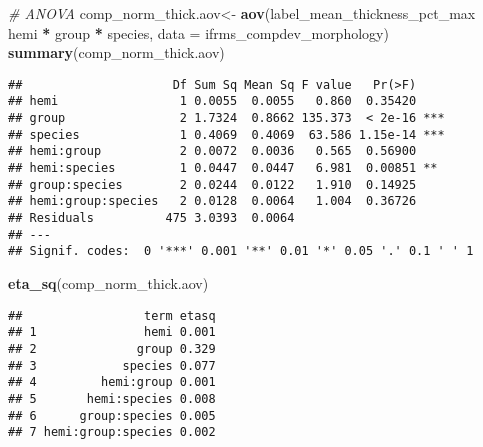 \documentclass[
]{article}
\newenvironment{Shaded}{\begin{snugshade}}{\end{snugshade}}
\newcommand{\CommentTok}[1]{\textcolor[rgb]{0.56,0.35,0.01}{\textit{#1}}}
\newcommand{\DataTypeTok}[1]{\textcolor[rgb]{0.13,0.29,0.53}{#1}}
\newcommand{\KeywordTok}[1]{\textcolor[rgb]{0.13,0.29,0.53}{\textbf{#1}}}
\newcommand{\NormalTok}[1]{#1}
\newcommand{\OperatorTok}[1]{\textcolor[rgb]{0.81,0.36,0.00}{\textbf{#1}}}
\newcommand{\StringTok}[1]{\textcolor[rgb]{0.31,0.60,0.02}{#1}}
\begin{document}
\begin{Shaded}
\begin{Highlighting}[]
\CommentTok{# ANOVA}
\NormalTok{comp_norm_thick.aov<-}\StringTok{ }\KeywordTok{aov}\NormalTok{(label_mean_thickness_pct_max }\OperatorTok{~}\StringTok{ }\NormalTok{hemi }\OperatorTok{*}\StringTok{ }\NormalTok{group }\OperatorTok{*}\StringTok{ }\NormalTok{species, }
                          \DataTypeTok{data =}\NormalTok{ ifrms_compdev_morphology)}
\KeywordTok{summary}\NormalTok{(comp_norm_thick.aov)}
\end{Highlighting}
\end{Shaded}

\begin{verbatim}
##                     Df Sum Sq Mean Sq F value   Pr(>F)    
## hemi                 1 0.0055  0.0055   0.860  0.35420    
## group                2 1.7324  0.8662 135.373  < 2e-16 ***
## species              1 0.4069  0.4069  63.586 1.15e-14 ***
## hemi:group           2 0.0072  0.0036   0.565  0.56900    
## hemi:species         1 0.0447  0.0447   6.981  0.00851 ** 
## group:species        2 0.0244  0.0122   1.910  0.14925    
## hemi:group:species   2 0.0128  0.0064   1.004  0.36726    
## Residuals          475 3.0393  0.0064                     
## ---
## Signif. codes:  0 '***' 0.001 '**' 0.01 '*' 0.05 '.' 0.1 ' ' 1
\end{verbatim}

\begin{Shaded}
\begin{Highlighting}[]
\KeywordTok{eta_sq}\NormalTok{(comp_norm_thick.aov)}
\end{Highlighting}
\end{Shaded}

\begin{verbatim}
##                 term etasq
## 1               hemi 0.001
## 2              group 0.329
## 3            species 0.077
## 4         hemi:group 0.001
## 5       hemi:species 0.008
## 6      group:species 0.005
## 7 hemi:group:species 0.002
\end{verbatim}

\begin{Shaded}
\end{Shaded}
\end{document}
